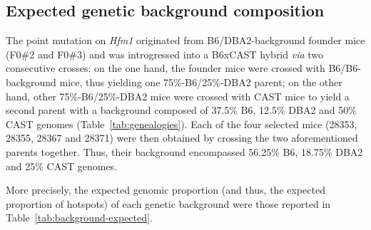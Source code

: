 \subsection{Expected genetic background composition}


The point mutation on \textit{Hfm1} originated from B6/DBA2-background founder mice (F0\#2 and F0\#3) and was introgressed into a B6xCAST hybrid \textit{via} two consecutive crosses: 
on the one hand, the founder mice were crossed with B6/B6-background mice, thus yielding one 75\%-B6/25\%-DBA2 parent;
on the other hand, other 75\%-B6/25\%-DBA2 mice were crossed with CAST mice to yield a second parent with a background composed of 37.5\% B6, 12.5\% DBA2 and 50\% CAST genomes (Table~\ref{tab:genealogies}).
Each of the four selected mice (28353, 28355, 28367 and 28371) were then obtained by crossing the two aforementioned parents together.
Thus, their background encompassed 56.25\% B6, 18.75\% DBA2 and 25\% CAST genomes.

More precisely, the expected genomic proportion (and thus, the expected proportion of hotspots) of each genetic background were those reported in Table~\ref{tab:background-expected}.


